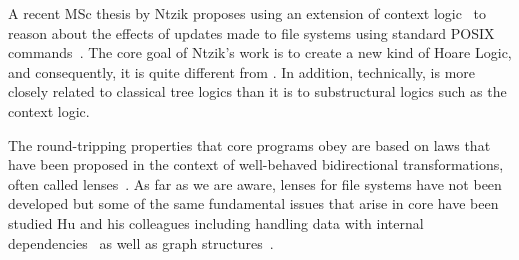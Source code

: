 A recent MSc thesis by Ntzik proposes using an extension of context
logic~\cite{context-logic} to reason about the effects of updates
made to file systems using standard POSIX
commands~\cite{ntzik-msc}.  The core goal of Ntzik's work
is to create a new kind of Hoare Logic, and consequently,
it is quite different from \forest{}.  In addition, technically,
\forest{} is more closely related to classical tree logics than
it is to substructural logics such as the context logic.

The round-tripping properties that core \forest{} programs obey are
based on laws that have been proposed in the context of well-behaved
bidirectional transformations, often called lenses~\cite{lenses}. As
far as we are aware, lenses for file systems have not been developed
but some of the same fundamental issues that arise in core \forest{}
have been studied Hu and his colleagues including handling data with
internal dependencies~\cite{MuAlgebraic2004} as well as graph
structures~\cite{hidaka-graphs}.
